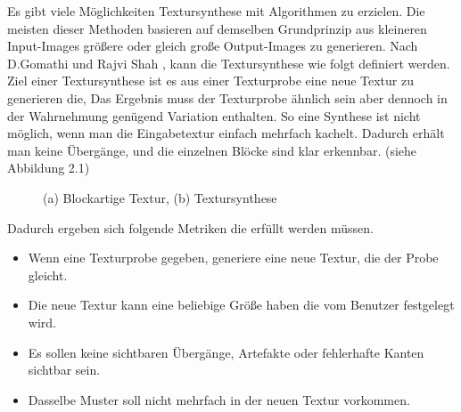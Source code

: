 \documentclass[12pt, a4paper,twoside,openright]{report} %
\begin{document}
Es gibt viele Möglichkeiten Textursynthese mit Algorithmen zu erzielen.
Die meisten dieser Methoden basieren auf demselben Grundprinzip aus kleineren Input-Images größere oder gleich große Output-Images zu generieren.
Nach D.Gomathi und Rajvi Shah \cite[S.1]{GomathiShah2009}, kann die Textursynthese wie folgt definiert werden.
\newline
Ziel einer Textursynthese ist es aus einer Texturprobe eine neue Textur zu generieren die, 
Das Ergebnis muss der Texturprobe ähnlich sein aber dennoch in der Wahrnehmung genügend Variation enthalten.
So eine Synthese ist nicht möglich, wenn man die Eingabetextur einfach mehrfach kachelt.
Dadurch erhält man keine  Übergänge, und die einzelnen Blöcke sind klar erkennbar. {(siehe Abbildung 2.1)}

\begin{figure}[H]
    \centering
    \qquad
    \caption{(a) Blockartige Textur, (b) Textursynthese}%
\end{figure}

\noindent Dadurch ergeben sich folgende Metriken die erfüllt werden müssen.

\begin{itemize}
    \item Wenn eine Texturprobe gegeben, generiere eine neue Textur, die der Probe gleicht.
    \item Die neue Textur kann eine beliebige Größe haben die vom Benutzer festgelegt wird.
    \item Es sollen keine sichtbaren Übergänge, Artefakte oder fehlerhafte Kanten sichtbar sein.
    \item Dasselbe Muster soll nicht mehrfach in der neuen Textur vorkommen. \cite[S.2]{GomathiShah2009}
\end{itemize}
\end{document}
